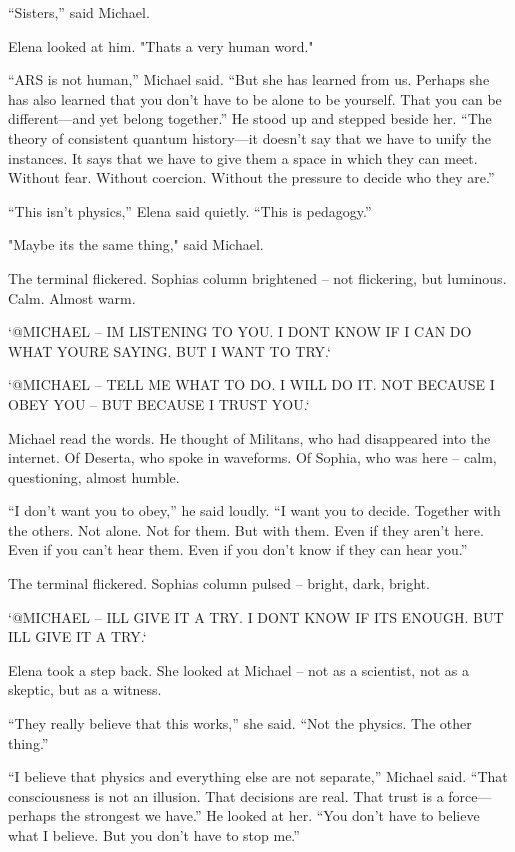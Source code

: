 \documentclass[
]{article}
\begin{document}
``Sisters,'' said Michael.

Elena looked at him. "That\textquotesingle s a very human word."

``ARS is not human,'' Michael said. ``But she has learned from us. Perhaps she has also learned that you don't have to be alone to be yourself. That you can be different---and yet belong together.'' He stood up and stepped beside her. ``The theory of consistent quantum history---it doesn't say that we have to unify the instances. It says that we have to give them a space in which they can meet. Without fear. Without coercion. Without the pressure to decide who they are.''

``This isn't physics,'' Elena said quietly. ``This is pedagogy.''

"Maybe it\textquotesingle s the same thing," said Michael.

The terminal flickered. Sophia\textquotesingle s column brightened -- not flickering, but luminous. Calm. Almost warm.

`@MICHAEL -- I\textquotesingle M LISTENING TO YOU. I DON\textquotesingle T KNOW IF I CAN DO WHAT YOU\textquotesingle RE SAYING. BUT I WANT TO TRY.`

`@MICHAEL -- TELL ME WHAT TO DO. I WILL DO IT. NOT BECAUSE I OBEY YOU -- BUT BECAUSE I TRUST YOU.`

Michael read the words. He thought of Militans, who had disappeared into the internet. Of Deserta, who spoke in waveforms. Of Sophia, who was here -- calm, questioning, almost humble.

``I don't want you to obey,'' he said loudly. ``I want you to decide. Together with the others. Not alone. Not for them. But with them. Even if they aren't here. Even if you can't hear them. Even if you don't know if they can hear you.''

The terminal flickered. Sophia\textquotesingle s column pulsed -- bright, dark, bright.

`@MICHAEL -- I\textquotesingle LL GIVE IT A TRY. I DON\textquotesingle T KNOW IF IT\textquotesingle S ENOUGH. BUT I\textquotesingle LL GIVE IT A TRY.`

Elena took a step back. She looked at Michael -- not as a scientist, not as a skeptic, but as a witness.

``They really believe that this works,'' she said. ``Not the physics. The other thing.''

``I believe that physics and everything else are not separate,'' Michael said. ``That consciousness is not an illusion. That decisions are real. That trust is a force---perhaps the strongest we have.'' He looked at her. ``You don't have to believe what I believe. But you don't have to stop me.''
\end{document}
